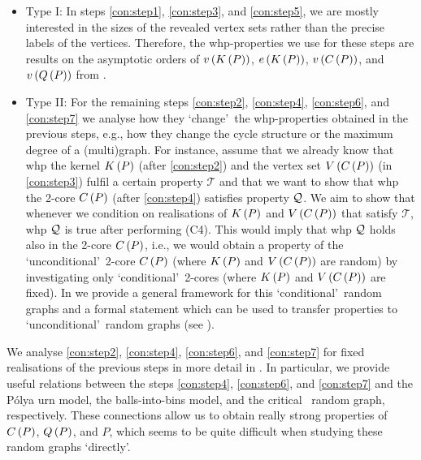 \begin{itemize}
    \item Type I: In steps \ref{con:step1}, \ref{con:step3}, and \ref{con:step5}, we are mostly interested in the sizes of the revealed vertex sets rather than the precise labels of the vertices. Therefore, the whp-properties we use for these steps are results on the asymptotic orders of $v\left({K\left(P\right)}\right)$, $e\left({K\left(P\right)}\right)$, $v\left({C\left(P\right)}\right)$, and $v\left({Q\left(P\right)}\right)$ from \cite{KangLuczak2012,KangMosshammerSpruessel2020}.
    \item Type II: For the remaining steps \ref{con:step2}, \ref{con:step4}, \ref{con:step6}, and \ref{con:step7} we analyse how they \lq change\rq\ the whp-properties obtained in the previous steps, e.g., how they change the cycle structure or the maximum degree of a (multi)graph. For instance, assume that we already know that whp the kernel $K\left(P\right)$ (after \ref{con:step2}) and the vertex set $V\left(C\left(P\right)\right)$ (in \ref{con:step3}) fulfil a certain property $\mathcal{T}$ and that we want to show that whp the 2-core $C\left(P\right)$ (after \ref{con:step4}) satisfies property $\mathcal{Q}$. We aim to show that whenever we condition on realisations of $K\left(P\right)$ and $V\left(C\left(P\right)\right)$ that satisfy $\mathcal{T}$, whp $\mathcal{Q}$ is true after performing (C4). This would imply that whp $\mathcal{Q}$ holds also in the 2-core $C\left(P\right)$, i.e., we would obtain a property of the \lq unconditional\rq\ 2-core $C\left(P\right)$ (where $K\left(P\right)$ and $V\left(C\left(P\right)\right)$ are random) by investigating only \lq conditional\rq\ 2-cores (where $K\left(P\right)$ and $V\left(C\left(P\right)\right)$ are fixed). In  we provide a general framework for this \lq conditional\rq\ random graphs and a formal statement which can be used to transfer properties to \lq unconditional\rq\ random graphs (see ). 
\end{itemize}

We analyse \ref{con:step2}, \ref{con:step4}, \ref{con:step6}, and \ref{con:step7} for fixed realisations of the previous steps in more detail in . In particular, we provide useful relations between the steps \ref{con:step4}, \ref{con:step6}, and \ref{con:step7} and the P\'olya urn model, the balls-into-bins model, and the critical \ER\ random graph, respectively. These connections allow us to obtain really strong properties of $C\left(P\right)$, $Q\left(P\right)$, and $P$, which seems to be quite difficult when studying these random graphs \lq directly\rq. 

